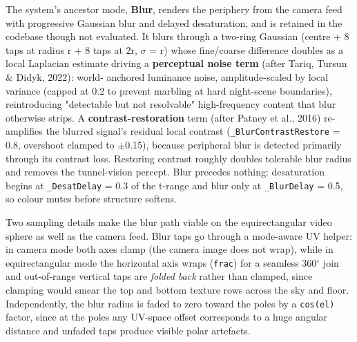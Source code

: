 The system's ancestor mode, \textbf{Blur}, renders the periphery from the camera feed with progressive
Gaussian blur and delayed desaturation, and is retained in the codebase though not evaluated. It
blurs through a two-ring Gaussian
(centre + 8 taps at radius r + 8 taps at 2r, $\sigma$ = r) whose fine/coarse difference doubles as a local
Laplacian estimate driving a \textbf{perceptual noise term} (after Tariq, Tursun \& Didyk, 2022): world-
anchored luminance noise, amplitude-scaled by local variance (capped at 0.2 to prevent marbling at
hard night-scene boundaries), reintroducing "detectable but not resolvable" high-frequency content
that blur otherwise strips. A \textbf{contrast-restoration} term (after Patney et al., 2016) re-amplifies
the blurred signal's residual local contrast (\verb|_BlurContrastRestore| = 0.8, overshoot clamped to
$\pm$0.15), because peripheral blur is detected primarily through its contrast loss. Restoring contrast
roughly doubles tolerable blur radius and removes the tunnel-vision percept. Blur precedes nothing:
desaturation begins at \verb|_DesatDelay| = 0.3 of the t-range and blur only at \verb|_BlurDelay| = 0.5, so
colour mutes before structure softens.

Two sampling details make the blur path viable on the equirectangular video sphere as well as the
camera feed. Blur taps go through a mode-aware UV helper: in camera mode both axes clamp (the camera
image does not wrap), while in equirectangular mode the horizontal axis wraps (\verb|frac|) for a seamless
360$^{\circ}$ join and out-of-range vertical taps are \textit{folded back} rather than clamped, since clamping
would smear the top and bottom texture rows across the sky and floor. Independently, the blur radius
is faded to zero toward the poles by a \verb|cos(el)| factor, since at the poles any UV-space offset
corresponds to a huge angular distance and unfaded taps produce visible polar artefacts.

